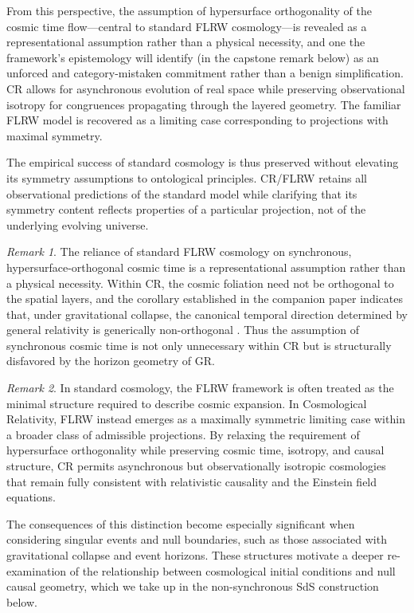 \documentclass[11pt,a4paper]{article}
\theoremstyle{plain}
\theoremstyle{definition}
\theoremstyle{remark}
\newtheorem{remark}{Remark}
\begin{document}
From this perspective, the assumption of hypersurface orthogonality of the cosmic time flow---central to standard FLRW cosmology---is revealed as a representational assumption rather than a physical necessity, and one the framework's epistemology will identify (in the capstone remark below) as an unforced and category-mistaken commitment rather than a benign simplification. CR allows for asynchronous evolution of real space while preserving observational isotropy for congruences propagating through the layered geometry. The familiar FLRW model is recovered as a limiting case corresponding to projections with maximal symmetry.

The empirical success of standard cosmology is thus preserved without elevating its symmetry assumptions to ontological principles. CR/FLRW retains all observational predictions of the standard model while clarifying that its symmetry content reflects properties of a particular projection, not of the underlying evolving universe.

\begin{remark}
The reliance of standard FLRW cosmology on synchronous, hypersurface-orthogonal cosmic time is a representational assumption rather than a physical necessity. Within CR, the cosmic foliation need not be orthogonal to the spatial layers, and the corollary established in the companion paper indicates that, under gravitational collapse, the canonical temporal direction determined by general relativity is generically non-orthogonal \cite{JanzenBHcausality}. Thus the assumption of synchronous cosmic time is not only unnecessary within CR but is structurally disfavored by the horizon geometry of GR.
\end{remark}

\begin{remark}
In standard cosmology, the FLRW framework is often treated as the minimal structure required to describe cosmic expansion. In Cosmological Relativity, FLRW instead emerges as a maximally symmetric limiting case within a broader class of admissible projections. By relaxing the requirement of hypersurface orthogonality while preserving cosmic time, isotropy, and causal structure, CR permits asynchronous but observationally isotropic cosmologies that remain fully consistent with relativistic causality and the Einstein field equations.

The consequences of this distinction become especially significant when considering singular events and null boundaries, such as those associated with gravitational collapse and event horizons. These structures motivate a deeper re-examination of the relationship between cosmological initial conditions and null causal geometry, which we take up in the non-synchronous SdS construction below.
\end{remark}
\end{document}
